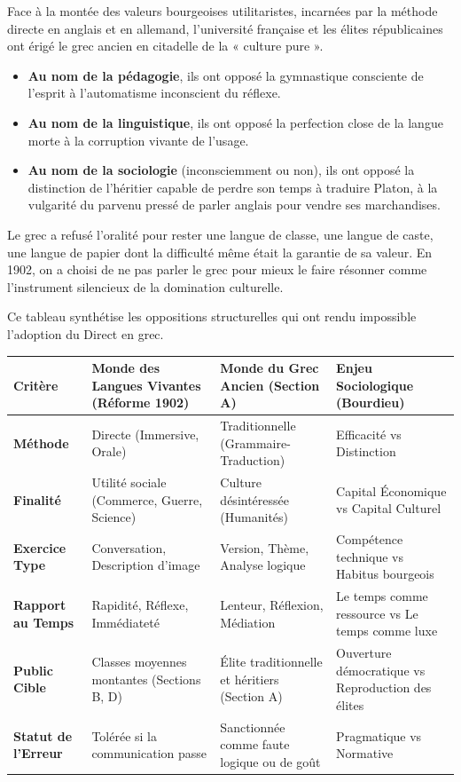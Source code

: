 Face à la montée des valeurs bourgeoises utilitaristes, incarnées par la méthode directe en anglais
et en allemand, l'université française et les élites républicaines ont érigé le grec ancien en
citadelle de la « culture pure ».

\begin{itemize}\item \textbf{Au nom de la pédagogie}, ils ont opposé la gymnastique consciente de l'esprit à l'automatisme inconscient du réflexe.\item \textbf{Au nom de la linguistique}, ils ont opposé la perfection close de la langue morte à la corruption vivante de l'usage.\item \textbf{Au nom de la sociologie} (inconsciemment ou non), ils ont opposé la distinction de l'héritier capable de perdre son temps à traduire Platon, à la vulgarité du parvenu pressé de parler anglais pour vendre ses marchandises.\end{itemize}Le grec a refusé l'oralité pour rester une langue de classe, une langue de caste, une langue de
papier dont la difficulté même était la garantie de sa valeur. En 1902, on a choisi de ne pas parler
le grec pour mieux le faire résonner comme l'instrument silencieux de la domination culturelle.

Ce tableau synthétise les oppositions structurelles qui ont rendu impossible l'adoption du \og
Direct\fg{} en grec.

\begin{table}[h!]\small\centering\begin{tabular}{| p{2cm} | p{2.2cm} | p{2.2cm} | p{2.2cm} |}\hline\textbf{Critère} & \textbf{Monde des Langues Vivantes (Réforme 1902)} & \textbf{Monde du Grec Ancien (Section A)} & \textbf{Enjeu Sociologique (Bourdieu)} \\ \hline\textbf{Méthode} & Directe (Immersive, Orale) & Traditionnelle (Grammaire-Traduction) & Efficacité vs Distinction \\ \hline\textbf{Finalité} & Utilité sociale (Commerce, Guerre, Science) & Culture désintéressée (Humanités) & Capital Économique vs Capital Culturel \\ \hline\textbf{Exercice Type} & Conversation, Description d'image & Version, Thème, Analyse logique & Compétence technique vs Habitus bourgeois \\ \hline\textbf{Rapport au Temps} & Rapidité, Réflexe, Immédiateté & Lenteur, Réflexion, Médiation & Le temps comme ressource vs Le temps comme luxe \\ \hline\textbf{Public Cible} & Classes moyennes montantes (Sections B, D) & Élite traditionnelle et héritiers (Section A) & Ouverture démocratique vs Reproduction des élites \\ \hline\textbf{Statut de l'Erreur} & Tolérée si la communication passe & Sanctionnée comme faute logique ou de goût & Pragmatique vs Normative \\ \hline\end{tabular}\end{table}